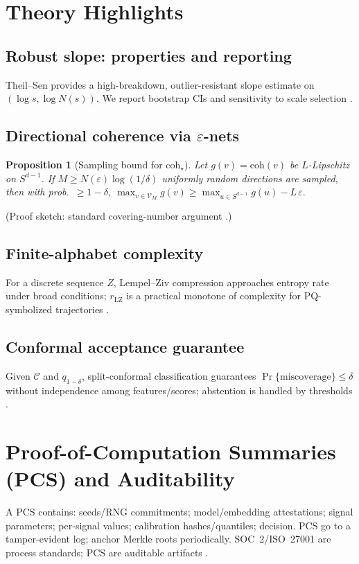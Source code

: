 \documentclass[11pt]{article}
\newtheorem{proposition}{Proposition}
\begin{document}
\section{Theory Highlights}
\subsection{Robust slope: properties and reporting}
Theil--Sen provides a high-breakdown, outlier-resistant slope estimate on $(\log s,\log N(s))$. We report bootstrap CIs and sensitivity to scale selection \citep{sen1968}.

\subsection{Directional coherence via $\varepsilon$-nets}
\begin{proposition}[Sampling bound for $\mathrm{coh}_\star$]
Let $g(v)=\mathrm{coh}(v)$ be $L$-Lipschitz on $S^{d-1}$. If $M\ge N(\varepsilon)\log(1/\delta)$ uniformly random directions are sampled, then with prob.\ $\ge 1-\delta$,
$
\max_{v\in\mathcal{V}_M} g(v) \ge \max_{u\in S^{d-1}} g(u) - L\,\varepsilon.
$
\end{proposition}
\noindent(Proof sketch: standard covering-number argument \citep{vershynin2018hdp}.)

\subsection{Finite-alphabet complexity}
For a discrete sequence $Z$, Lempel--Ziv compression approaches entropy rate under broad conditions; $r_{\mathrm{LZ}}$ is a practical monotone of complexity for PQ-symbolized trajectories \citep{ziv1978,shannon1948}.

\subsection{Conformal acceptance guarantee}
Given $\mathcal{C}$ and $q_{1-\delta}$, split-conformal classification guarantees $\Pr\{\text{miscoverage}\}\le\delta$ without independence among features/scores; abstention is handled by thresholds \citep{angelopoulos2023gentle,shafer2008tutorial}.

\section{Proof-of-Computation Summaries (PCS) and Auditability}
A PCS contains: seeds/RNG commitments; model/embedding attestations; signal parameters; per-signal values; calibration hashes/quantiles; decision. PCS go to a tamper-evident log; anchor Merkle roots periodically. SOC~2/ISO~27001 are process standards; PCS are auditable artifacts \citep{aicpa-soc2}.
\end{document}
